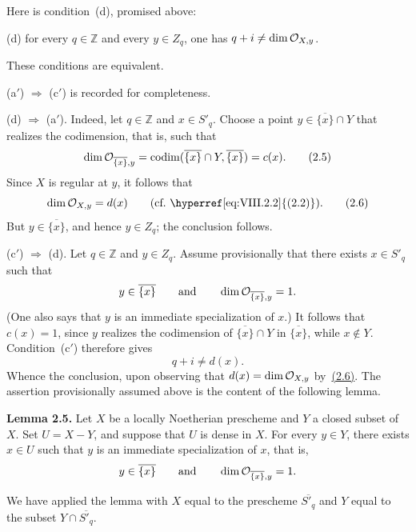 \medskip
\noindent Here is condition~(d), promised above:

\medskip
\noindent\textup{(d)} for every $q\in\mathbb Z$ and every $y\in Z_q$,
one has $q+i\ne\dim\mathcal O_{X,y}$.

\medskip
\noindent These conditions are equivalent.

\smallskip
\noindent\textup{(a$'$)} $\Rightarrow$ \textup{(c$'$)} is recorded for
completeness.

\smallskip
\noindent\textup{(d)} $\Rightarrow$ \textup{(a$'$)}. Indeed, let
$q\in\mathbb Z$ and $x\in S'_q$. Choose a point
$y\in\overline{\{x\}}\cap Y$ that realizes the
codimension, that is,
such that
\begin{equation}\label{eq:VIII.2.5}
  \dim\mathcal O_{\overline{\{x\}},y}
  =\operatorname{codim}(\overline{\{x\}}\cap Y,\overline{\{x\}})=c(x).
  \tag{2.5}
\end{equation}
Since $X$ is regular at $y$, it follows that
\begin{equation}\label{eq:VIII.2.6}
  \dim\cO_{X,y}=d(x)\qquad\text{(cf.~\hyperref[eq:VIII.2.2]{(2.2)}).}
  \tag{2.6}
\end{equation}
But $y\in\overline{\{x\}}$, and hence $y\in Z_q$; the conclusion follows.

\smallskip
\noindent\textup{(c$'$)} $\Rightarrow$ \textup{(d)}. Let $q\in\mathbb Z$
and $y\in Z_q$. Assume provisionally that there exists $x\in S'_q$ such
that
\[
  y\in\overline{\{x\}}\qquad\text{and}\qquad
  \dim\mathcal O_{\overline{\{x\}},y}=1.
\]
(One also says that $y$ is an immediate specialization of $x$.) It follows
that $c(x)=1$, since $y$ realizes the codimension of
$\overline{\{x\}}\cap Y$ in $\overline{\{x\}}$, while $x\notin Y$.
Condition~\textup{(c$'$)} therefore gives
\[
  q+i\ne d(x).
\]
Whence the conclusion, upon observing that $d(x)=\dim\mathcal O_{X,y}$ by~\hyperref[eq:VIII.2.6]{(2.6)}.
The assertion provisionally assumed above is the content of the following
lemma.

\medskip
{}\noindent\textbf{Lemma 2.5.} Let $X$ be a locally Noetherian prescheme and
$Y$ a closed subset of $X$. Set $U=X-Y$, and suppose that $U$ is dense in
$X$. For every $y\in Y$, there exists $x\in U$ such that $y$ is an immediate
specialization of $x$, that is,
\[
  y\in\overline{\{x\}}\qquad\text{and}\qquad
  \dim\mathcal O_{\overline{\{x\}},y}=1.
\]

We have applied the lemma with $X$ equal to the prescheme
$\overline{S'_q}$ and $Y$ equal to the subset
$Y\cap\overline{S'_q}$.

